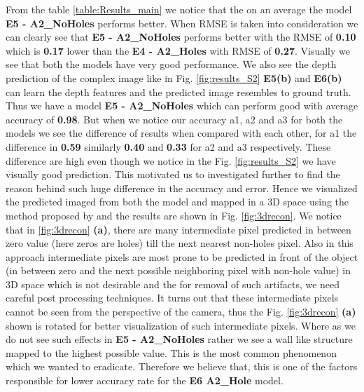 From the table \ref{table:Results_main} we notice that the on an average the model \textbf{E5 - A2\_NoHoles} performs better. When RMSE is taken into consideration we can clearly see that \textbf{E5 - A2\_NoHoles} performs better with the RMSE of \textbf{0.10} which is \textbf{0.17} lower than the \textbf{E4 - A2\_Holes} with RMSE of \textbf{0.27}. Visually we see that both the models have very good performance. We also see the depth prediction of the complex image like in Fig. \ref{fig:results_S2} \textbf{E5(b)} and  \textbf{E6(b)} can learn the depth features and the predicted image resembles to ground truth. Thus we have a model \textbf{E5 - A2\_NoHoles} which can perform good with average accuracy of \textbf{0.98}. But when we notice our accuracy a1, a2 and a3 for both the models we see the difference of results when compared with each other, for a1 the difference in \textbf{0.59} similarly \textbf{0.40} and \textbf{0.33} for a2 and a3 respectively. These difference are high even though we notice in the Fig. \ref{fig:results_S2} we have visually good prediction. This motivated us to investigated further to find the reason behind such huge difference in the accuracy and error. Hence we visualized the predicted imaged from both the model and mapped in a 3D space using the method proposed by \cite{Zhou2018} and the results are shown in Fig. \ref{fig:3drecon}. We notice that in \ref{fig:3drecon} \textbf{(a)}, there are many intermediate pixel predicted in between zero value (here zeros are holes) till the next nearest non-holes pixel. Also in this approach intermediate pixels are most prone to be predicted in front of the object (in between zero and the next possible neighboring pixel with non-hole value) in 3D space which is not desirable and the for removal of such artifacts, we need careful post processing techniques. It turns out that these intermediate pixels cannot be seen from the perspective of the camera, thus the Fig. \ref{fig:3drecon} \textbf{(a)} shown is rotated for better visualization of such intermediate pixels. Where as we do not see such effects in \textbf{E5 - A2\_NoHoles} rather we see a wall like structure mapped to the highest possible value. This is the most common phenomenon which we wanted to eradicate. Therefore we believe that, this is one of the factors responsible for lower accuracy rate for the \textbf{E6 A2\_Hole} model. 

